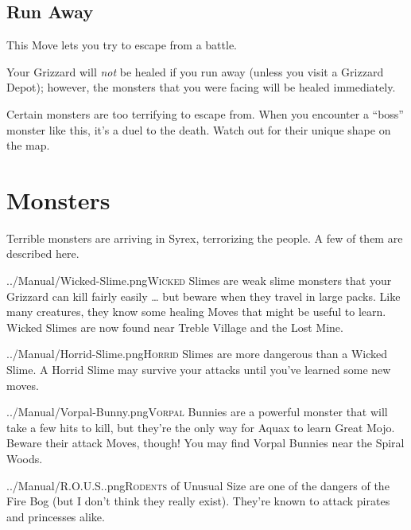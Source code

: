 \documentclass[10pt,twocolumn,openany,article]{memoir}
\begin{document}
\begin{description}
\fi

\section{Run Away}

This Move lets you try to escape from a battle.

Your Grizzard  will \emph{not}  be healed  if you  run away  (unless you
visit a Grizzard Depot); however, the monsters that you were facing will
be healed immediately.

Certain monsters are  too terrifying to escape from.  When you encounter
a ``boss'' monster  like this, it's a  duel to the death.  Watch out for
their unique shape on the map.

\chapter{Monsters}

Terrible monsters are  arriving in Syrex, terrorizing the  people. A few
of them are described here.

\vspace{14pt}

\lettrine[image=true,       lines=5, findent=3pt, nindent=3pt]{../Manual/Wicked-Slime.png}{Wicked}
Slimes are weak slime monsters that your Grizzard can kill fairly easily
… but beware when they travel  in large packs. Like many creatures, they
know some healing Moves that might be useful to learn. Wicked Slimes are
now found near Treble Village and the Lost Mine.

\vspace{14pt}

\lettrine[image=true,       lines=5, findent=3pt, nindent=3pt]{../Manual/Horrid-Slime.png}{Horrid}
Slimes  are more  dangerous  than a  Wicked Slime.  A  Horrid Slime  may
survive your attacks until you've learned some new moves.

\vspace{14pt}

\lettrine[image=true,       lines=5, findent=3pt, nindent=3pt]{../Manual/Vorpal-Bunny.png}{Vorpal}
Bunnies are a  powerful monster that will  take a few hits  to kill, but
they're the only way for Aquax  to learn Great Mojo. Beware their attack
Moves, though! You may find Vorpal Bunnies near the Spiral Woods.

\vspace{14pt}

\lettrine[image=true,    lines=5, findent=3pt, nindent=3pt]{../Manual/R.O.U.S..png}{Rodents}    of
Unusual Size are one  of the dangers of the Fire Bog  (but I don't think
they   really   exist).   They're    known   to   attack   pirates   and
princesses alike.


\end{description}
\end{document}
